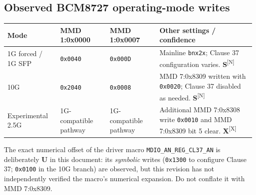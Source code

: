 \documentclass[10pt,a4paper]{article}
\newcommand{\m}[1]{\textsf{\color{blue}\bfseries #1}}
\newcommand{\unk}{\textsf{\color{amber}\bfseries U}}
\newcommand{\src}[1]{\textsuperscript{[#1]}}
\begin{document}
\subsection{Observed BCM8727 operating-mode writes}
\begin{tabularx}{\linewidth}{@{}p{31mm}p{34mm}p{34mm}X@{}}\toprule
\textbf{Mode} & \textbf{MMD 1:0x0000} & \textbf{MMD 1:0x0007} & \textbf{Other settings / confidence}\\\midrule
1G forced / 1G SFP & \texttt{0x0040} & \texttt{0x000D} & Mainline \texttt{bnx2x}; Clause 37 configuration varies. \m{S}\src{N}\\
10G & \texttt{0x2040} & \texttt{0x0008} & MMD 7:0x8309 written with \texttt{0x0020}; Clause 37 disabled as needed. \m{S}\src{N}\\
Experimental 2.5G & 1G-compatible pathway & 1G-compatible pathway & Additional MMD 7:0x8308 write \texttt{0x0010} and MMD 7:0x8309 bit 5 clear. \m{X}\src{X}\\
\bottomrule\end{tabularx}
The exact numerical offset of the driver macro \texttt{MDIO\_AN\_REG\_CL37\_AN} is deliberately \unk{} in this document: its \emph{symbolic} writes (\texttt{0x1300} to configure Clause 37; \texttt{0x0100} in the 10G branch) are observed, but this revision has not independently verified the macro's numerical expansion. Do not conflate it with MMD 7:0x8309.
\end{document}

